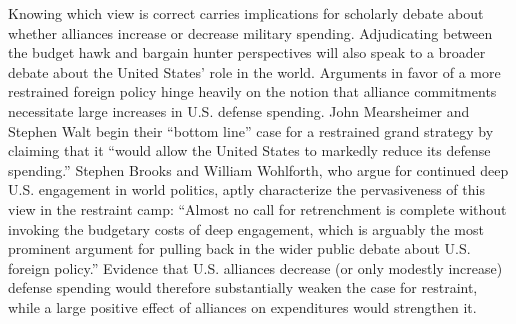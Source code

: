 Knowing which view is correct carries implications for scholarly debate about whether alliances increase or decrease military spending.\autocite[See, for example,][]{Alley2020,DigiuseppePoast2016,Diehl1994} Adjudicating between the budget hawk and bargain hunter perspectives will also speak to a broader debate about the United States' role in the world. Arguments in favor of a more restrained foreign policy hinge heavily on the notion that alliance commitments necessitate large increases in U.S. defense spending.\autocite[See, for example,][]{gholzIS97,layneIS97,Posen2014} John Mearsheimer and Stephen Walt begin their ``bottom line'' case for a restrained grand strategy by claiming that it ``would allow the United States to markedly reduce its defense spending.''\autocite[83]{mearsheimerFA16} Stephen Brooks and William Wohlforth, who argue for continued deep U.S. engagement in world politics, aptly characterize the pervasiveness of this view in the restraint camp: ``Almost no call for retrenchment is complete without invoking the budgetary costs of deep engagement, which is arguably the most prominent argument for pulling back in the wider public debate about U.S. foreign policy.''\autocite[123]{brooksamerica16} Evidence that U.S. alliances decrease (or only modestly increase) defense spending would therefore substantially weaken the case for restraint, while a large positive effect of alliances on expenditures would strengthen it.



